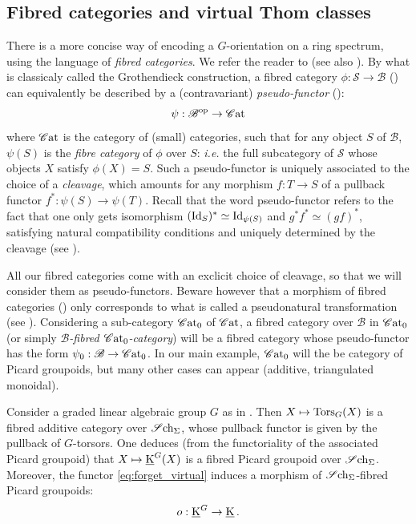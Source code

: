 \subsection{Fibred categories and virtual Thom classes}

\begin{num}\label{num:fibred_cat&K}
There is a more concise way of encoding
a $G$-orientation on a ring spectrum, using the language of \emph{fibred categories}.
We refer the reader to \cite{Vistoli} (see also \cite{Gray}).
 By what is classicaly called the Grothendieck construction,
 a fibred category $\phi:\mathscr S \rightarrow \mathscr B$ (\cite[Def. 3.5]{Vistoli})
 can equivalently be described by a (contravariant) \emph{pseudo-functor} (\cite[Prop. 3.13]{Vistoli}):
$$
\psi:\mathscr B^{\mathrm{op}} \rightarrow \operatorname{\mathscr Cat}
$$
where $\operatorname{\mathscr Cat}$ is the category of (small) categories, such that for any object $S$ of $\mathscr B$,
$\psi(S)$ is the \emph{fibre category} of $\phi$ over $S$: \emph{i.e.} the full subcategory of $\mathscr S$ whose objects
$X$ satisfy $\phi(X)=S$. Such a pseudo-functor is uniquely associated to the choice of a \emph{cleavage},
which amounts for any morphism $f:T \rightarrow S$ of a pullback functor
$f^*:\psi(S) \rightarrow \psi(T)$. Recall that the word pseudo-functor refers to the fact that one
only gets isomorphism $(\operatorname{Id}_S)^* \simeq \operatorname{Id}_{\psi(S)}$ and $g^*f^* \simeq (gf)^*$, satisfying
natural compatibility conditions and uniquely determined by the cleavage (see \cite[Def. 3.10]{Vistoli}).

All our fibred categories come with an exclicit choice of cleavage, so that we will consider them
as pseudo-functors. Beware however that a morphism of fibred categories (\cite[Def. 3.6]{Vistoli})
only corresponds to what is called a pseudonatural transformation (see \cite[end of 1.5 and 1.6(c)]{Gray}).
Considering a sub-category $\operatorname{\mathscr Cat}_0$ of $\operatorname{\mathscr Cat}$,
a fibred category over $\mathscr B$ in $\operatorname{\mathscr Cat}_0$ (or simply \emph{$\mathscr B$-fibred $\operatorname{\mathscr Cat}_0$-category})
will be a fibred category whose pseudo-functor has
the form $\psi_0:\mathscr B \rightarrow \operatorname{\mathscr Cat}_0$.
In our main example, $\operatorname{\mathscr Cat}_0$ will the be category of Picard groupoids,
but many other cases can appear (additive, triangulated monoidal).

Consider a graded linear algebraic group $G$ as in .
Then $X \mapsto \operatorname{Tors}_G(X)$ is a fibred additive category over $\operatorname{\mathscr Sch_\Sigma}$,
whose pullback functor is given by the pullback of $G$-torsors.
One deduces (from the functoriality of the associated Picard groupoid)
that $X \mapsto \operatorname{\underline K}^G(X)$ is a fibred Picard groupoid over $\operatorname{\mathscr Sch_\Sigma}$.
Moreover, the functor \eqref{eq:forget_virtual} induces a morphism
of $\operatorname{\mathscr Sch_\Sigma}$-fibred Picard groupoids:
$$
o:\operatorname{\underline K}^G \rightarrow \operatorname{\underline K}.
$$


\end{num}
